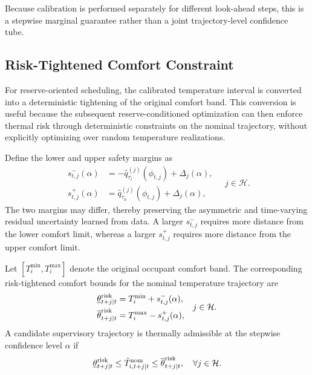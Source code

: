 \documentclass[journal]{IEEEtran}
\theoremstyle{remark}
\begin{document}
Because calibration is performed separately for different look-ahead steps, this is a stepwise marginal guarantee rather than a joint trajectory-level confidence tube.

\subsection{Risk-Tightened Comfort Constraint}

For reserve-oriented scheduling, the calibrated temperature interval is
converted into a deterministic tightening of the original comfort band.
This conversion is useful because the subsequent reserve-conditioned
optimization can then enforce thermal risk through deterministic
constraints on the nominal trajectory, without explicitly optimizing
over random temperature realizations.

Define the lower and upper safety margins as
\begin{equation}
	\begin{aligned}
		s^-_{t,j}(\alpha)
		&=
		-\hat q_{\tau_l}^{(j)}(\phi_{t,j})
		+
		\Delta_j(\alpha),\\
		s^+_{t,j}(\alpha)
		&=
		\hat q_{\tau_u}^{(j)}(\phi_{t,j})
		+
		\Delta_j(\alpha),
	\end{aligned}
	\quad j\in\mathcal H .
	\label{eq:safety_margins}
\end{equation}
The two margins may differ, thereby preserving the asymmetric and
time-varying residual uncertainty learned from data. A larger
\(s^-_{t,j}\) requires more distance from the lower comfort limit,
whereas a larger \(s^+_{t,j}\) requires more distance from the upper
comfort limit.

Let \([T_i^{\min},T_i^{\max}]\) denote the original occupant comfort
band. The corresponding risk-tightened comfort bounds for the nominal
temperature trajectory are
\begin{equation}
	\begin{aligned}
		\underline{\theta}^{\rm risk}_{t+j|t}
		&=
		T_i^{\min}
		+
		s^-_{t,j}(\alpha),\\
		\overline{\theta}^{\rm risk}_{t+j|t}
		&=
		T_i^{\max}
		-
		s^+_{t,j}(\alpha),
	\end{aligned}
	\quad j\in\mathcal H .
	\label{eq:risk_bounds}
\end{equation}
A candidate supervisory trajectory is thermally admissible at the
stepwise confidence level \(\alpha\) if
\begin{equation}
	\underline{\theta}^{\rm risk}_{t+j|t}
	\le
	\hat T^{\rm nom}_{i,t+j|t}
	\le
	\overline{\theta}^{\rm risk}_{t+j|t},
	\quad \forall j\in\mathcal H .
	\label{eq:risk_tightened_constraint}
\end{equation}
\end{document}
